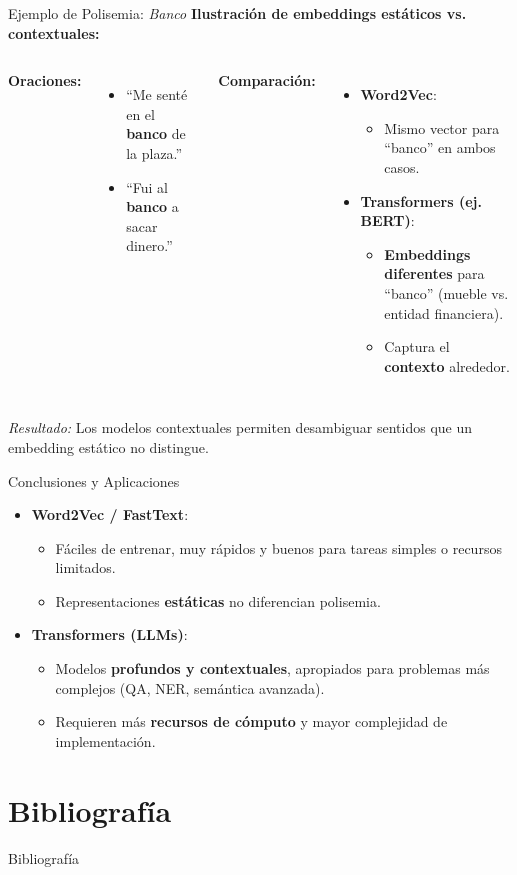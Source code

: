 \documentclass{beamer}
\begin{document}
\begin{frame}{Ejemplo de Polisemia: \textit{Banco}}
  \textbf{Ilustración de embeddings estáticos vs. contextuales:}\\[6pt]
  \begin{columns}[T]
      \textbf{Oraciones:}
      \begin{itemize}
        \item ``Me senté en el \textbf{banco} de la plaza.''
        \item ``Fui al \textbf{banco} a sacar dinero.''
      \end{itemize}
      \textbf{Comparación:}
      \begin{itemize}
        \item \textbf{Word2Vec}: 
          \begin{itemize}
            \item Mismo vector para ``banco'' en ambos casos.
          \end{itemize}
        \item \textbf{Transformers (ej. BERT)}:
          \begin{itemize}
            \item \textbf{Embeddings diferentes} para ``banco'' (mueble vs. entidad financiera).
            \item Captura el \textbf{contexto} alrededor.
          \end{itemize}
      \end{itemize}
  \end{columns}
  \vspace{0.5em}
  \textit{Resultado:} Los modelos contextuales permiten desambiguar sentidos que un embedding estático no distingue.
\end{frame}

\begin{frame}{Conclusiones y Aplicaciones}
  \begin{itemize}
    \item \textbf{Word2Vec / FastText}:
      \begin{itemize}
        \item Fáciles de entrenar, muy rápidos y buenos para tareas simples o recursos limitados.
        \item Representaciones \textbf{estáticas} no diferencian polisemia.
      \end{itemize}
    \item \textbf{Transformers (LLMs)}:
      \begin{itemize}
        \item Modelos \textbf{profundos y contextuales}, apropiados para problemas más complejos (QA, NER, semántica avanzada).
        \item Requieren más \textbf{recursos de cómputo} y mayor complejidad de implementación.
      \end{itemize}
  \end{itemize}
\end{frame}


\section{Bibliografía}
\begin{frame}[allowframebreaks]{Bibliografía}


\end{frame}
\end{document}
